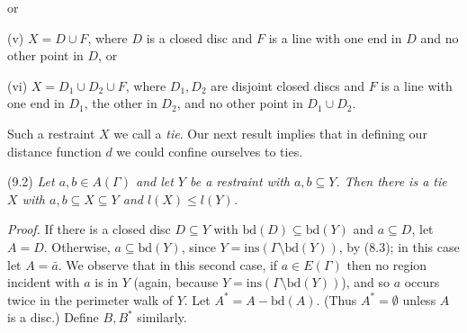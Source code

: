 \noindent or

\hspace*{12pt}(v) $X = D \cup F$, where $D$ is a closed disc and $F$ is a line with one end in $D$ and no other point in $D$, or

\hspace*{12pt}(vi) $X = D_1 \cup D_2 \cup F$, where $D_1, D_2$ are disjoint closed discs and $F$ is a line with one end in $D_1$, the other in $D_2$, and no other point in $D_1 \cup D_2$.

Such a restraint $X$ we call a \textit{tie}. Our next result implies that in defining our distance function $d$ we could confine ourselves to ties.

\stmt
(9.2) \textit{Let $a, b \in A(\Gamma)$ and let $Y$ be a restraint with $a, b \subseteq Y$. Then there is a tie $X$ with $a, b \subseteq X \subseteq Y$ and $l(X) \le l(Y)$.}

\textit{Proof.} If there is a closed disc $D \subseteq Y$ with $\text{bd}(D) \subseteq \text{bd}(Y)$ and $a \subseteq D$, let $A = D$. Otherwise, $a \subseteq \text{bd}(Y)$, since $Y = \text{ins}(\Gamma \setminus \text{bd}(Y))$, by (8.3); in this case let $A = \bar{a}$. We observe that in this second case, if $a \in E(\Gamma)$ then no region incident with $a$ is in $Y$ (again, because $Y = \text{ins}(\Gamma \setminus \text{bd}(Y))$), and so $a$ occurs twice in the perimeter walk of $Y$. Let $A^* = A - \text{bd}(A)$. (Thus $A^* = \emptyset$ unless $A$ is a disc.) Define $B, B^*$ similarly.

